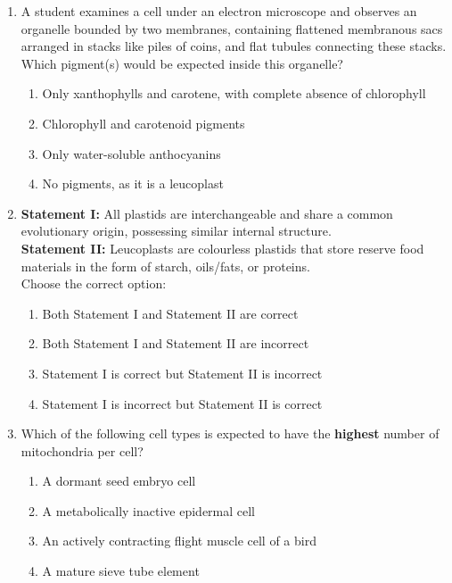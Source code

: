 \documentclass[11pt, a4paper]{article}
\begin{document}
\begin{enumerate}[label=\textbf{\arabic*.}, leftmargin=*, itemsep=8pt]
    \item A student examines a cell under an electron microscope and observes an organelle bounded by two membranes, containing flattened membranous sacs arranged in stacks like piles of coins, and flat tubules connecting these stacks. Which pigment(s) would be expected inside this organelle?
    \begin{enumerate}[label=(\alph*)]
        \item Only xanthophylls and carotene, with complete absence of chlorophyll
        \item Chlorophyll and carotenoid pigments
        \item Only water-soluble anthocyanins
        \item No pigments, as it is a leucoplast
    \end{enumerate}

    \item \textbf{Statement I:} All plastids are interchangeable and share a common evolutionary origin, possessing similar internal structure.\\
    \textbf{Statement II:} Leucoplasts are colourless plastids that store reserve food materials in the form of starch, oils/fats, or proteins.\\
    Choose the correct option:
    \begin{enumerate}[label=(\alph*)]
        \item Both Statement I and Statement II are correct
        \item Both Statement I and Statement II are incorrect
        \item Statement I is correct but Statement II is incorrect
        \item Statement I is incorrect but Statement II is correct
    \end{enumerate}

    \item Which of the following cell types is expected to have the \textbf{highest} number of mitochondria per cell?
    \begin{enumerate}[label=(\alph*)]
        \item A dormant seed embryo cell
        \item A metabolically inactive epidermal cell
        \item An actively contracting flight muscle cell of a bird
        \item A mature sieve tube element
    \end{enumerate}


\end{enumerate}
\end{document}
